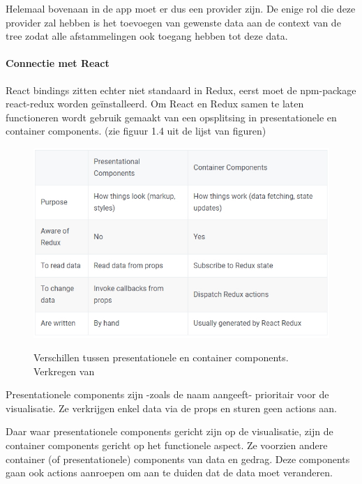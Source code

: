 Helemaal bovenaan in de app moet er dus een provider zijn. De enige rol die deze provider zal hebben is het toevoegen van gewenste data aan de context van de tree zodat alle afstammelingen ook toegang hebben tot deze data.


\paragraph{Connectie met React}
React bindings zitten echter niet standaard in Redux, eerst moet de npm-package react-redux worden geïnstalleerd. Om React en Redux samen te laten functioneren wordt gebruik gemaakt van een opsplitsing in presentationele en container components. (zie figuur 1.4 uit de lijst van figuren) 

\begin{figure}
	\begin{center}
		\caption{Verschillen tussen presentationele en container components. Verkregen van \textcite{prescon}}
		\includegraphics[width=13cm]{img/presentational-vs-container}\\[0.5cm]
	\end{center}
\end{figure}

Presentationele components zijn -zoals de naam aangeeft- prioritair voor de visualisatie. Ze verkrijgen enkel data via de props en sturen geen actions aan. 

Daar waar presentationele components gericht zijn op de visualisatie, zijn de container components gericht op het functionele aspect. Ze voorzien andere container (of presentationele) components van data en gedrag. Deze components gaan ook actions aanroepen om aan te duiden dat de data moet veranderen.  
\autocite{prescon}
\autocite{prescon2}

